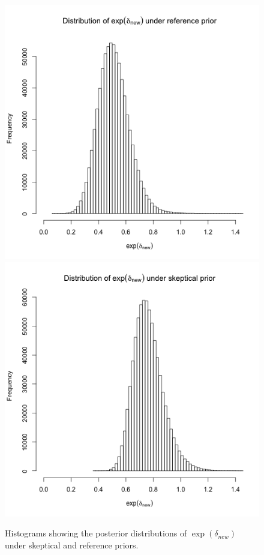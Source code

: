 \documentclass[fleqn,10pt]{SelfArx} %
\begin{document}
\begin{center}
\begin{figure}
\includegraphics[scale=0.55]{./../figures/reference_hist.png}\\
\includegraphics[scale=0.55]{./../figures/skeptical_hist.png}
\caption{Histograms showing the posterior distributions of $\exp(\delta_{new})$ under skeptical and reference priors.}
\label{fig:post_hists}
\end{figure}
\end{center}
\end{document}
